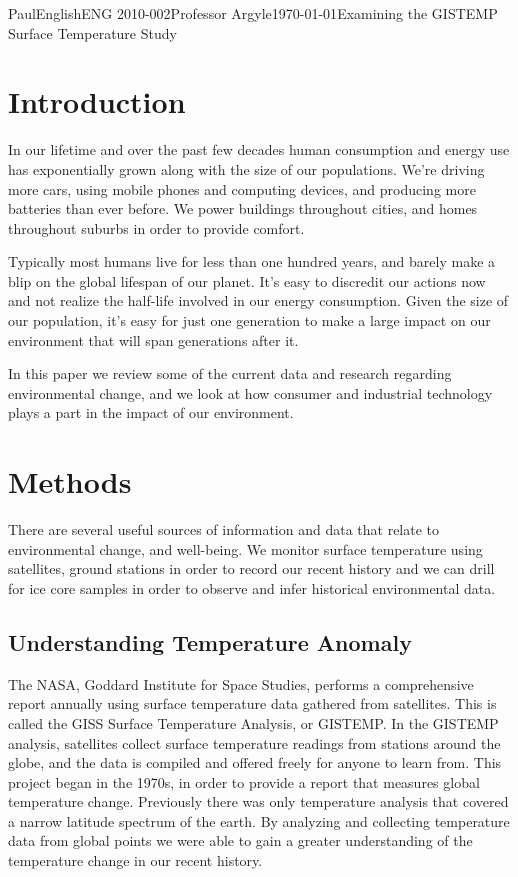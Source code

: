 \documentclass[12pt,letterpaper]{article}
\begin{document}
\begin{mla}{Paul}{English}{ENG 2010-002}{Professor Argyle}{\today}{Examining the GISTEMP Surface Temperature Study}

\section{Introduction}
In our lifetime and over the past few decades human consumption and energy use has exponentially grown along with the size of our populations. We're driving more cars, using mobile phones and computing devices, and producing more batteries than ever before. We power buildings throughout cities, and homes throughout suburbs in order to provide comfort. 

Typically most humans live for less than one hundred years, and barely make a blip on the global lifespan of our planet. It's easy to discredit our actions now and not realize the half-life involved in our energy consumption. Given the size of our population, it's easy for just one generation to make a large impact on our environment that will span generations after it.

In this paper we review some of the current data and research regarding environmental change, and we look at how consumer and industrial technology plays a part in the impact of our environment. 

\section{Methods}
There are several useful sources of information and data that relate to environmental change, and well-being. We monitor surface temperature using satellites, ground stations in order to record our recent history and we can drill for ice core samples in order to observe and infer historical environmental data.

\subsection{Understanding Temperature Anomaly}
The NASA, Goddard Institute for Space Studies, performs a comprehensive report annually using surface temperature data gathered from satellites. This is called the GISS Surface Temperature Analysis, or GISTEMP. In the GISTEMP analysis, satellites collect surface temperature readings from stations around the globe, and the data is compiled and offered freely for anyone to learn from. This project began in the 1970s, in order to provide a report that measures global temperature change. Previously there was only temperature analysis that covered a narrow latitude spectrum of the earth. By analyzing and collecting temperature data from global points we were able to gain a greater understanding of the temperature change in our recent history.


\end{mla}
\end{document}
